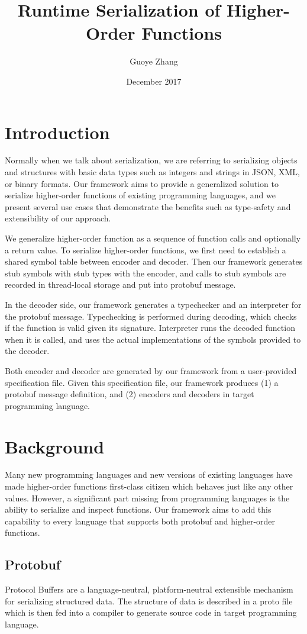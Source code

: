 \documentclass[12pt]{article}
\title{Runtime Serialization of Higher-Order Functions}
\author{Guoye Zhang}
\date{December 2017}
\begin{document}
\maketitle
\section{Introduction}
Normally when we talk about serialization, we are referring to serializing objects and structures with basic data types such as integers and strings in JSON, XML, or binary formats. Our framework aims to provide a generalized solution to serialize higher-order functions of existing programming languages, and we present several use cases that demonstrate the benefits such as type-safety and extensibility of our approach.

We generalize higher-order function as a sequence of function calls and optionally a return value. To serialize higher-order functions, we first need to establish a shared symbol table between encoder and decoder. Then our framework generates stub symbols with stub types with the encoder, and calls to stub symbols are recorded in thread-local storage and put into protobuf message.

In the decoder side, our framework generates a typechecker and an interpreter for the protobuf message. Typechecking is performed during decoding, which checks if the function is valid given its signature. Interpreter runs the decoded function when it is called, and uses the actual implementations of the symbols provided to the decoder.

Both encoder and decoder are generated by our framework from a user-provided specification file. Given this specification file, our framework produces (1) a protobuf message definition, and (2) encoders and decoders in target programming language.

\section{Background}
Many new programming languages and new versions of existing languages have made higher-order functions first-class citizen which behaves just like any other values. However, a significant part missing from programming languages is the ability to serialize and inspect functions. Our framework aims to add this capability to every language that supports both protobuf and higher-order functions.

\subsection{Protobuf}
Protocol Buffers \cite{protobuf} are a language-neutral, platform-neutral extensible mechanism for serializing structured data. The structure of data is described in a proto file which is then fed into a compiler to generate source code in target programming language.
\end{document}
